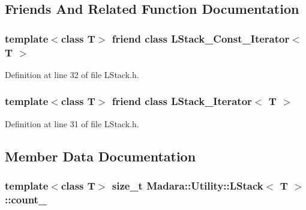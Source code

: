 \subsection{Friends And Related Function Documentation}
\hypertarget{classMadara_1_1Utility_1_1LStack_a89d40a24a48c96d1efbe20a313795474}{
\subsubsection[{LStack\_\-Const\_\-Iterator$<$ T $>$}]{\setlength{\rightskip}{0pt plus 5cm}template$<$class T$>$ friend class {\bf LStack\_\-Const\_\-Iterator}$<$ T $>$}}
\label{d1/d68/classMadara_1_1Utility_1_1LStack_a89d40a24a48c96d1efbe20a313795474}


Definition at line 32 of file LStack.h.

\hypertarget{classMadara_1_1Utility_1_1LStack_afd49fb0e9c9c1eca4995543b40730bd6}{
\subsubsection[{LStack\_\-Iterator$<$ T $>$}]{\setlength{\rightskip}{0pt plus 5cm}template$<$class T$>$ friend class {\bf LStack\_\-Iterator}$<$ T $>$}}
\label{d1/d68/classMadara_1_1Utility_1_1LStack_afd49fb0e9c9c1eca4995543b40730bd6}


Definition at line 31 of file LStack.h.



\subsection{Member Data Documentation}
\hypertarget{classMadara_1_1Utility_1_1LStack_a64be724a51b269619e725752a4ea221b}{
\subsubsection[{count\_\-}]{\setlength{\rightskip}{0pt plus 5cm}template$<$class T$>$ size\_\-t {\bf Madara::Utility::LStack}$<$ T $>$::{\bf count\_\-}}}
\label{d1/d68/classMadara_1_1Utility_1_1LStack_a64be724a51b269619e725752a4ea221b}


